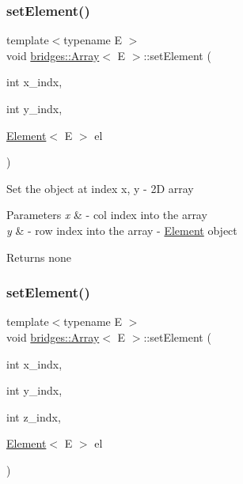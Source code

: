 \subsubsection{\texorpdfstring{set\+Element()}{setElement()}\hspace{0.1cm}{\footnotesize\ttfamily [2/3]}}
{\footnotesize\ttfamily template$<$typename E $>$ \\
void \mbox{\hyperlink{classbridges_1_1_array}{bridges\+::\+Array}}$<$ E $>$\+::set\+Element (\begin{DoxyParamCaption}\item[{int}]{x\+\_\+indx,  }\item[{int}]{y\+\_\+indx,  }\item[{\mbox{\hyperlink{classbridges_1_1_element}{Element}}$<$ E $>$}]{el }\end{DoxyParamCaption})\hspace{0.3cm}{\ttfamily [inline]}}

Set the object at index x, y -\/ 2D array


\begin{DoxyParams}{Parameters}
{\em x} & -\/ col index into the array \\
\hline
{\em y} & -\/ row index into the array  -\/ \mbox{\hyperlink{classbridges_1_1_element}{Element}} object\\
\hline
\end{DoxyParams}
\begin{DoxyReturn}{Returns}
none 
\end{DoxyReturn}
\mbox{\label{classbridges_1_1_array_a526c3a190b48a338541e5b4667c5eedf}} 
\subsubsection{\texorpdfstring{set\+Element()}{setElement()}\hspace{0.1cm}{\footnotesize\ttfamily [3/3]}}
{\footnotesize\ttfamily template$<$typename E $>$ \\
void \mbox{\hyperlink{classbridges_1_1_array}{bridges\+::\+Array}}$<$ E $>$\+::set\+Element (\begin{DoxyParamCaption}\item[{int}]{x\+\_\+indx,  }\item[{int}]{y\+\_\+indx,  }\item[{int}]{z\+\_\+indx,  }\item[{\mbox{\hyperlink{classbridges_1_1_element}{Element}}$<$ E $>$}]{el }\end{DoxyParamCaption})\hspace{0.3cm}{\ttfamily [inline]}}

